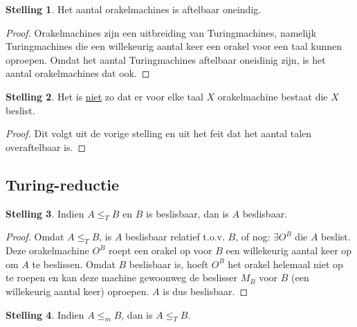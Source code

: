 \documentclass[kulak]{kulakarticle}
\theoremstyle{definition}
\newtheorem*{stelling}{Stelling}
\begin{document}
	\begin{stelling}
		Het aantal orakelmachines is aftelbaar oneindig.
	\end{stelling}

	\begin{proof}
		Orakelmachines zijn een uitbreiding van Turingmachines, namelijk Turingmachines die een willekeurig aantal keer een orakel voor een taal kunnen oproepen. Omdat het aantal Turingmachines aftelbaar oneidinig zijn, is het aantal orakelmachines dat ook.
	\end{proof}

	\begin{stelling}
		Het is \underline{niet} zo dat er voor elke taal \(X\) orakelmachine bestaat die \(X\) beslist.
	\end{stelling}

	\begin{proof}
		Dit volgt uit de vorige stelling en uit het feit dat het aantal talen overaftelbaar is.
	\end{proof}

	\subsection{Turing-reductie}

	\begin{stelling}
		Indien \( A \leq_T B \) en \( B \) is beslisbaar, dan is \( A \) beslisbaar.
	\end{stelling}

	\begin{proof}
		Omdat \( A \leq_T B \), is \(A\) beslisbaar relatief t.o.v. \(B\), of nog: \(\exists O^B\) die \(A\) beslist. Deze orakelmachine \( O^B \) roept een orakel op voor \(B\) een willekeurig aantal keer op om \(A\) te beslissen. Omdat \(B\) beslisbaar is, hoeft \(O^B\) het orakel helemaal niet op te roepen en kan deze machine gewoonweg de beslisser \(M_B\) voor \(B\) (een willekeurig aantal keer) oproepen. \(A\) is dus beslisbaar.
	\end{proof}

	\begin{stelling}
		Indien \(A \leq_m B\), dan is \(A \leq_T B\).
	\end{stelling}
\end{document}
